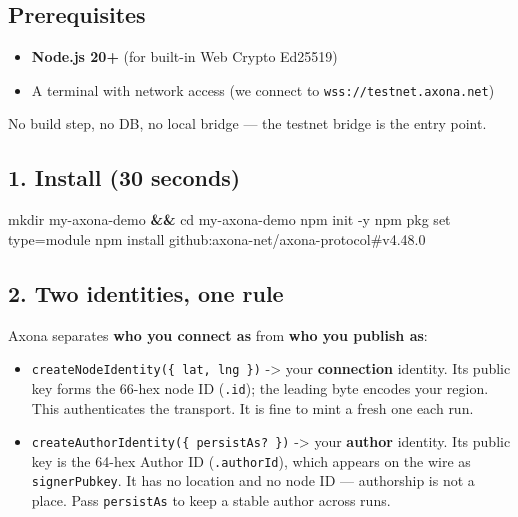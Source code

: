 \documentclass[
  nobib]{tufte-handout}
\newenvironment{Shaded}{}{}
\newcommand{\AttributeTok}[1]{\textcolor[rgb]{0.49,0.56,0.16}{#1}}
\newcommand{\BuiltInTok}[1]{\textcolor[rgb]{0.00,0.50,0.00}{#1}}
\newcommand{\ExtensionTok}[1]{#1}
\newcommand{\FunctionTok}[1]{\textcolor[rgb]{0.02,0.16,0.49}{#1}}
\newcommand{\KeywordTok}[1]{\textcolor[rgb]{0.00,0.44,0.13}{\textbf{#1}}}
\newcommand{\NormalTok}[1]{#1}
\providecommand{\tightlist}{%
  \setlength{\itemsep}{0pt}\setlength{\parskip}{0pt}}
\begin{document}
\subsection{Prerequisites}\label{prerequisites}

\begin{itemize}
\tightlist
\item
  \textbf{Node.js 20+} (for built-in Web Crypto Ed25519)
\item
  A terminal with network access (we connect to
  \texttt{wss://testnet.axona.net})
\end{itemize}

No build step, no DB, no local bridge --- the testnet bridge is the
entry point.

\subsection{1. Install (30 seconds)}\label{install-30-seconds}

\begin{Shaded}
\begin{Highlighting}[]
\FunctionTok{mkdir}\NormalTok{ my{-}axona{-}demo }\KeywordTok{\&\&} \BuiltInTok{cd}\NormalTok{ my{-}axona{-}demo}
\ExtensionTok{npm}\NormalTok{ init }\AttributeTok{{-}y}
\ExtensionTok{npm}\NormalTok{ pkg set type=module}
\ExtensionTok{npm}\NormalTok{ install github:axona{-}net/axona{-}protocol\#v4.48.0}
\end{Highlighting}
\end{Shaded}

\subsection{2. Two identities, one rule}\label{two-identities-one-rule}

Axona separates \textbf{who you connect as} from \textbf{who you publish
as}:

\begin{itemize}
\tightlist
\item
  \texttt{createNodeIdentity(\{\ lat,\ lng\ \})} -\textgreater{} your
  \textbf{connection} identity. Its public key forms the 66-hex node ID
  (\texttt{.id}); the leading byte encodes your region. This
  authenticates the transport. It is fine to mint a fresh one each run.
\item
  \texttt{createAuthorIdentity(\{\ persistAs?\ \})} -\textgreater{} your
  \textbf{author} identity. Its public key is the 64-hex Author ID
  (\texttt{.authorId}), which appears on the wire as
  \texttt{signerPubkey}. It has no location and no node ID ---
  authorship is not a place. Pass \texttt{persistAs} to keep a stable
  author across runs.
\end{itemize}
\end{document}
